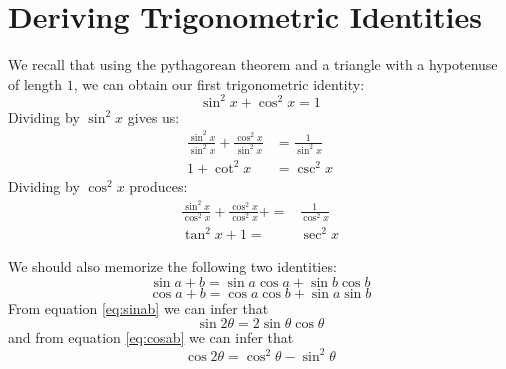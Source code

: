 \section{Deriving Trigonometric Identities}\label{sec:trigderiv}

We recall that using the pythagorean theorem and a triangle with a hypotenuse of length $1$, we can obtain our first trigonometric identity:
\begin{equation}
	\sin^2x+\cos^2x=1
  \label{eq:pyth}
\end{equation}
Dividing by $\sin^2x$ gives us:
\begin{align}
\frac{\sin^2x}{\sin^2x}+\frac{\cos^2x}{\sin^2x}&=\frac{1}{\sin^2x} \nonumber \\
	1+\cot^2x&=\csc^2x
\end{align}
Dividing by $\cos^2x$ produces:
\begin{align}
  \frac{\sin^2x}{\cos^2x}+\frac{\cos^2x}{\cos^2x}+=&\frac{1}{\cos^2x} \nonumber \\
	\tan^2x+1=&\sec^2x
\end{align}

We should also memorize the following two identities:
\begin{equation}
  \sin{a+b}=\sin a \cos a + \sin b \cos b
  \label{eq:sinab}
\end{equation}
\begin{equation}
  \cos{a+b}=\cos a \cos b + \sin a \sin b
  \label{eq:cosab}
\end{equation}
From equation \eqref{eq:sinab} we can infer that
\begin{equation}
  \sin{2\theta}=2 \sin \theta \cos \theta
  \label{eq:sin2q}
\end{equation}
and from equation \eqref{eq:cosab} we can infer that
\begin{equation}
  \cos{2\theta}=\cos^2 \theta - \sin^2\theta
  \label{eq:cos2q}
\end{equation}

